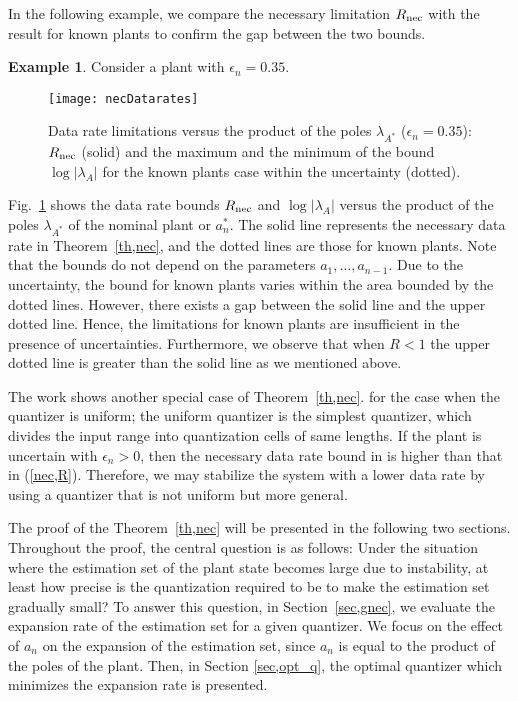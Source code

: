 \documentclass[a4paper, 11pt]{article}
\newcommand{\lambdaAS}{\lambda_{A^*}\!}
\newcommand{\lambdaA}{\lambda_{A}}
\newcommand{\Rnec}{R_{\textnormal{nec}}}
\theoremstyle{definition}
\newtheorem{exmp}{Example}
\newcommand{\fref}[1]{Fig.~\ref{#1}}
\begin{document}
In the following example, we compare the necessary limitation $\Rnec$ with
the result for known plants to confirm the gap between the two bounds.
\begin{exmp}\label{ex,neccomparison}
 Consider a plant with $\epsilon_n=0.35$.
\begin{figure}[t]
 \centering
 \texttt{[image: necDatarates]}
 \caption{Data rate limitations versus the product of the poles $\lambdaAS$
 ($\epsilon_n=0.35$):
 $\Rnec$ (solid) and the maximum and the minimum of the bound $\log|\lambdaA|$
 for the known plants case within the uncertainty (dotted).}
 \label{fig,nec_comparison}
\end{figure}
\fref{fig,nec_comparison} shows the data rate bounds $\Rnec$ and $\log|\lambdaA|$
versus the product of the poles $\lambdaAS$ of the nominal plant or $a_n^*$.
The solid line represents the necessary data rate in Theorem~\ref{th,nec},
and the dotted lines are those for known plants.
Note that the bounds do not depend on the parameters $a_{1},\dots,a_{n-1}$.
Due to the uncertainty, the bound for known plants varies within the area
bounded by the dotted lines.
However, there exists a gap between the solid line and the upper dotted line.
Hence, the limitations for known plants are insufficient in the presence of
uncertainties.
Furthermore, we observe that when $R<1$ the upper dotted line is greater
than the solid line as we mentioned above.
\end{exmp}



The work \cite{Okano2012} shows another special case of Theorem~\ref{th,nec}.
for the case when the quantizer is uniform;
the uniform quantizer is the simplest
quantizer, which divides the input range into quantization cells of same lengths.
If the plant is uncertain with $\epsilon_n>0$, then the necessary data rate
bound in \cite{Okano2012} is higher than that in (\ref{nec,R}).
Therefore, we may stabilize the system with a lower data rate by using
a quantizer that is not uniform but more general.


The proof of the Theorem~\ref{th,nec} will be presented in the following
two sections.
Throughout the proof, the central question is as follows:
Under the situation where the estimation set of the plant state becomes
large due to instability, at least how precise is the quantization
required to be to make the estimation set gradually small?
To answer this question, in Section~\ref{sec,gnec}, we evaluate the expansion
rate of the estimation set for a given quantizer.
We focus on the effect of $a_n$ on the expansion of the estimation set,
since $a_n$ is equal to the product of the poles of the plant.
Then, in Section \ref{sec,opt_q}, the optimal quantizer which minimizes
the expansion rate is presented.
\end{document}
